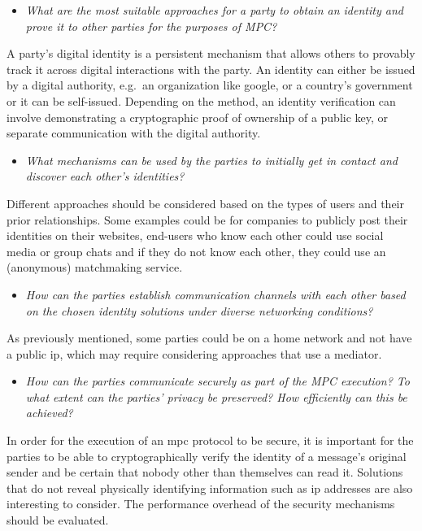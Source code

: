 \begin{itemize}
\tightlist
\item
  \emph{What are the most suitable approaches for a party to obtain an
  identity and prove it to other parties for the purposes of MPC?}
\end{itemize}

A party's digital identity is a persistent mechanism that allows others
to provably track it across digital interactions with the party. An
identity can either be issued by a digital authority, e.g.~an
organization like google, or a country's government or it can be
self-issued. Depending on the method, an identity verification can
involve demonstrating a cryptographic proof of ownership of a public
key, or separate communication with the digital authority.

\begin{itemize}
\tightlist
\item
  \emph{What mechanisms can be used by the parties to initially get in
  contact and discover each other's identities?}
\end{itemize}

Different approaches should be considered based on the types of users
and their prior relationships. Some examples could be for companies to
publicly post their identities on their websites, end-users who know
each other could use social media or group chats and if they do not know
each other, they could use an (anonymous) matchmaking service.

\begin{itemize}
\tightlist
\item
  \emph{How can the parties establish communication channels with each
  other based on the chosen identity solutions under diverse networking
  conditions?}
\end{itemize}

As previously mentioned, some parties could be on a home network and not
have a public \gls{ip}, which may require considering approaches that
use a mediator.

\begin{itemize}
\tightlist
\item
  \emph{How can the parties communicate securely as part of the MPC
  execution? To what extent can the parties' privacy be preserved? How
  efficiently can this be achieved?}
\end{itemize}

In order for the execution of an \gls{mpc} protocol to be secure, it is
important for the parties to be able to cryptographically verify the
identity of a message's original sender and be certain that nobody other
than themselves can read it. Solutions that do not reveal physically
identifying information such as \gls{ip} addresses are also interesting
to consider. The performance overhead of the security mechanisms should
be evaluated.

